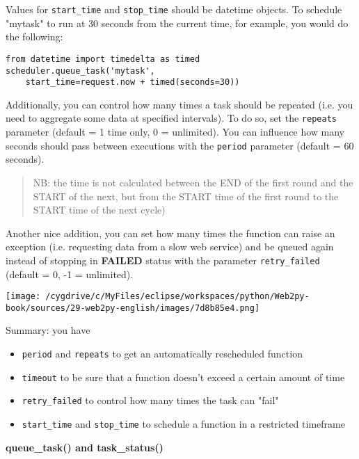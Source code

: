 \documentclass[justified,sixbynine,notoc]{tufte-book}
\def\ft{\small\tt}
\begin{document}
\begin{fullwidth}
Values for {\ft start\_time} and {\ft stop\_time} should be datetime objects. To schedule "mytask" to run at 30 seconds from the current time, for example, you would do the following:

\begin{lstlisting}
from datetime import timedelta as timed
scheduler.queue_task('mytask',
    start_time=request.now + timed(seconds=30))
\end{lstlisting}

Additionally, you can control how many times a task should be repeated (i.e. you need to aggregate some data at specified intervals). To do so, set the {\ft repeats}
parameter (default = 1 time only, 0 = unlimited). You can influence how many seconds should pass between executions with the {\ft period} parameter (default = 60 seconds).

\begin{quote}NB: the time is not calculated between the END of the first round and the START of the next, but from the START time of the first round to the START time of the next cycle)\end{quote}
Another nice addition, you can set how many times the function can raise an exception (i.e. requesting data from a slow web service) and be queued again instead of stopping in {\bf FAILED}  status with the parameter {\ft retry\_failed} (default = 0, -1 = unlimited).


\goodbreak\begin{center}\texttt{[image: /cygdrive/c/MyFiles/eclipse/workspaces/python/Web2py-book/sources/29-web2py-english/images/7d8b85e4.png]}\end{center}


Summary: you have
\begin{itemize}
\item {\ft period} and {\ft repeats} to get an automatically rescheduled function

\item {\ft timeout} to be sure that a function doesn't exceed a certain amount of time

\item {\ft retry\_failed} to control how many times the task can "fail"

\item {\ft start\_time} and {\ft stop\_time} to schedule a function in a restricted timeframe
\end{itemize}

{\bf queue\_task() and task\_status()}


\end{fullwidth}
\end{document}
